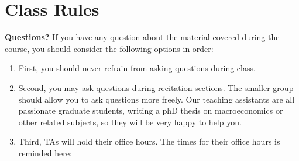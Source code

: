 \documentclass[]{book}
\theoremstyle{definition}
\theoremstyle{definition}
\theoremstyle{definition}
\theoremstyle{remark}
\begin{document}
\section*{Class Rules}\label{class-rules}

\textbf{Questions?} If you have any question about the material covered
during the course, you should consider the following options in order:

\begin{enumerate}
\def\labelenumi{\arabic{enumi}.}
\item
  First, you should never refrain from asking questions during class.
\item
  Second, you may ask questions during recitation sections. The smaller
  group should allow you to ask questions more freely. Our teaching
  assistants are all passionate graduate students, writing a phD thesis
  on macroeconomics or other related subjects, so they will be very
  happy to help you.
\item
  Third, TAs will hold their office hours. The times for their office
  hours is reminded here:


\end{enumerate}
\end{document}
